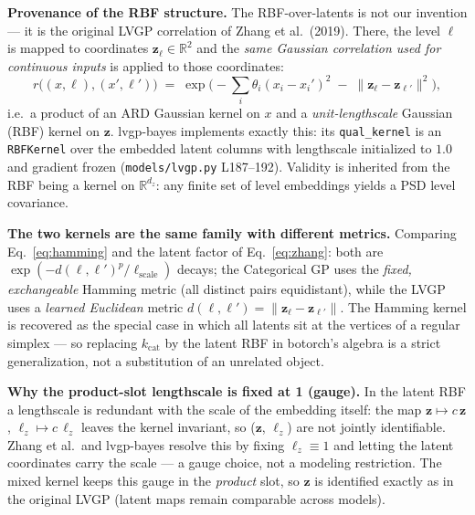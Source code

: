 \documentclass[11pt]{article}
\begin{document}
\textbf{Provenance of the RBF structure.} The RBF-over-latents is not our invention --- it is
the original LVGP correlation of Zhang et al.\ (2019). There, the level $\ell$ is mapped to
coordinates $\mathbf z_\ell \in \mathbb R^2$ and the \emph{same Gaussian correlation used for
continuous inputs} is applied to those coordinates:
\begin{equation}
r\big((x,\ell),(x',\ell')\big) \;=\;
\exp\!\Big(-\textstyle\sum_i \theta_i (x_i - x_i')^2 \;-\; \|\mathbf z_\ell -
\mathbf z_{\ell'}\|^2\Big),
\label{eq:zhang}
\end{equation}
i.e.\ a product of an ARD Gaussian kernel on $x$ and a \emph{unit-lengthscale} Gaussian (RBF)
kernel on $\mathbf z$. lvgp-bayes implements exactly this: its \texttt{qual\_kernel} is an
\texttt{RBFKernel} over the embedded latent columns with lengthscale initialized to $1.0$ and
gradient frozen (\texttt{models/lvgp.py} L187--192). Validity is inherited from the RBF being
a kernel on $\mathbb R^{d_z}$: any finite set of level embeddings yields a PSD level
covariance.

\textbf{The two kernels are the same family with different metrics.} Comparing
Eq.~\ref{eq:hamming} and the latent factor of Eq.~\ref{eq:zhang}: both are
$\exp(-d(\ell,\ell')^{p}/\ell_{\mathrm{scale}})$ decays; the Categorical GP uses the
\emph{fixed, exchangeable} Hamming metric (all distinct pairs equidistant), while the LVGP
uses a \emph{learned Euclidean} metric $d(\ell,\ell') = \|\mathbf z_\ell - \mathbf z_{\ell'}\|$.
The Hamming kernel is recovered as the special case in which all latents sit at the vertices
of a regular simplex --- so replacing $k_{\mathrm{cat}}$ by the latent RBF in botorch's
algebra is a strict generalization, not a substitution of an unrelated object.

\textbf{Why the product-slot lengthscale is fixed at 1 (gauge).} In the latent RBF a
lengthscale is redundant with the scale of the embedding itself: the map $\mathbf z \mapsto
c\,\mathbf z$, $\ell_z \mapsto c\,\ell_z$ leaves the kernel invariant, so ($\mathbf z$,
$\ell_z$) are not jointly identifiable. Zhang et al.\ and lvgp-bayes resolve this by fixing
$\ell_z \equiv 1$ and letting the latent coordinates carry the scale --- a gauge choice, not a
modeling restriction. The mixed kernel keeps this gauge in the \emph{product} slot, so
$\mathbf z$ is identified exactly as in the original LVGP (latent maps remain comparable
across models).
\end{document}
